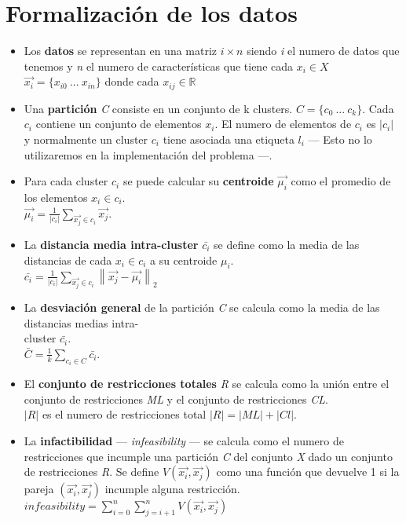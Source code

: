 \section{Formalización de los datos}
\begin{itemize}
   \item Los \textbf{datos} se representan en una matriz $ i \times n $ siendo \emph{i} el numero de datos que tenemos y \emph{n} el numero de características que tiene cada $ x_{i} \in X $ \\
   $ \vec{x_{i}} = \{x_{i0}\ ...\ x_{in}\} $ donde cada $ x_{ij} \in \mathbb{R} $
   \item Una \textbf{partición} \emph{C} consiste en un conjunto de k clusters. $ C = \{c_{0}\ ...\ c_{k}\} $. Cada $ c_{i} $ contiene un conjunto de elementos $ x_{i} $. El numero de elementos de $ c_{i} $ es $ \left | c_{i} \right | $ y normalmente un cluster $ c_{i} $ tiene asociada una etiqueta $ l_{i} $ --- Esto no lo utilizaremos en la implementación del problema ---.
   \item Para cada cluster $ c_{i} $ se puede calcular su \textbf{centroide} $ \vec{\mu_{i}} $ como el promedio de los elementos $ x_{i} \in c_{i} $.\\
   $ \vec{\mu_{i}} = \frac{1}{\left | c_{i} \right |}\sum_{\vec{x_{j}} \in c_{i}} \vec{x_{j}} $.
   \item La \textbf{distancia media intra-cluster} $ \bar{c_{i}} $ se define como la media de las distancias de cada $ x_{i} \in c_{i} $ a su centroide $ \mu_{i} $.\\
   $ \bar{c_{i}} = \frac{1}{\left | c_{i} \right |}\sum_{\vec{x_{j}} \in c_{i}} \left \| \vec{x_{j}} - \vec{\mu_{i}} \right \|_{2} $
   \item La \textbf{desviación general} de la partición \emph{C} se calcula como la media de las distancias medias intra-\\cluster $ \bar{c_{i}} $.\\
   $ \bar{C} = \frac{1}{k}\sum_{c_{i} \in C} \bar{c_i} $.
   \item El \textbf{conjunto de restricciones totales} \emph{R} se calcula como la unión entre el conjunto de restricciones \emph{ML} y el conjunto de restricciones \emph{CL}.\\
   $ \left | R \right | $ es el numero de restricciones total $ \left | R \right | = \left | ML \right | + \left | Cl \right | $.
   \item La \textbf{infactibilidad} --- \emph{infeasibility} --- se calcula como el numero de restricciones que incumple una partición \emph{C} del conjunto \emph{X} dado un conjunto de restricciones \emph{R}. Se define $ V(\vec{x_{i}},\vec{x_{j}}) $ como una función que devuelve 1 si la pareja $ (\vec{x_{i}},\vec{x_{j}}) $ incumple alguna restricción.\\
   $ infeasibility = \sum_{i=0}^{n} \sum_{j=i+1}^{n} V(\vec{x_{i}},\vec{x_{j}}) $
\end{itemize}
